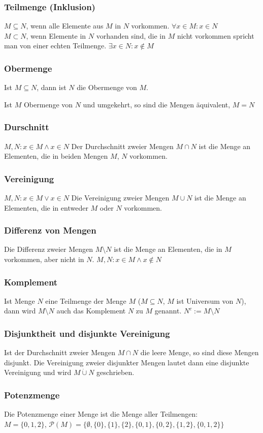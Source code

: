 \subsubsection{Teilmenge (Inklusion)}
$M \subseteq N$, wenn alle Elemente aus $M$ in $N$ vorkommen. $\forall x \in M: x \in N$ \\
$M \subset N$, wenn Elemente in $N$ vorhanden sind, die in $M$ nicht vorkommen spricht man von einer echten Teilmenge. $\exists x \in N: x \notin M$

\subsubsection{Obermenge}
Ist $M \subseteq N$, dann ist $N$ die Obermenge von $M$.

Ist $M$ Obermenge von $N$ und umgekehrt, so sind die Mengen äquivalent, $M = N$

\subsubsection{Durschnitt}
$M,N : x \in M \wedge x \in N$
Der Durchschnitt zweier Mengen $M \cap N$ ist die Menge an Elementen, die in beiden Mengen $M$, $N$ vorkommen.

\subsubsection{Vereinigung}
$M,N: x \in M \vee x \in N$
Die Vereinigung zweier Mengen $M \cup N$ ist die Menge an Elementen, die in entweder $M$ oder $N$ vorkommen.

\subsubsection{Differenz von Mengen}
Die Differenz zweier Mengen $M\setminus N$ ist die Menge an Elementen, die in $M$ vorkommen, aber nicht in $N$.
$M,N : x \in M \wedge x \notin N$

\subsubsection{Komplement}
Ist Menge $N$ eine Teilmenge der Menge $M$ ($M \subseteq N$, $M$ ist Universum von $N$), dann wird $M \setminus N$ auch das Komplement $N$ zu $M$ genannt. $N^c := M \setminus N$

\subsubsection{Disjunktheit und disjunkte Vereinigung}
Ist der Durchschnitt zweier Mengen $M \cap N$ die leere Menge, so sind diese Mengen disjunkt. Die Vereinigung zweier disjunkter Mengen lautet dann eine disjunkte Vereinigung und wird $M \dot{\cup} N$ geschrieben.

\subsubsection{Potenzmenge}
Die Potenzmenge einer Menge ist die Menge aller Teilmengen:\\
$M = \{0,1,2\}$, $\mathcal{P}(M)= \{\emptyset, \{0\}, \{1\}, \{2\}, \{0,1\}, \{0,2\}, \{1,2\}, \{0,1,2\}\}$
